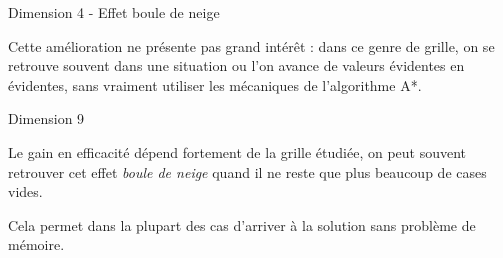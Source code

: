\begin{frame}

\begin{block}{Dimension 4 - Effet boule de neige}

Cette amélioration ne présente pas grand intérêt : dans ce genre de grille, on se retrouve souvent dans une situation ou l'on avance de valeurs évidentes en évidentes, sans vraiment utiliser les mécaniques de l'algorithme A*.

\end{block}


\begin{block}{Dimension 9}

Le gain en efficacité dépend fortement de la grille étudiée, on peut souvent retrouver cet effet \textit{boule de neige} quand il ne reste que plus beaucoup de cases vides.

\bigskip

Cela permet dans la plupart des cas d'arriver à la solution sans problème de mémoire.

\end{block}


\end{frame}